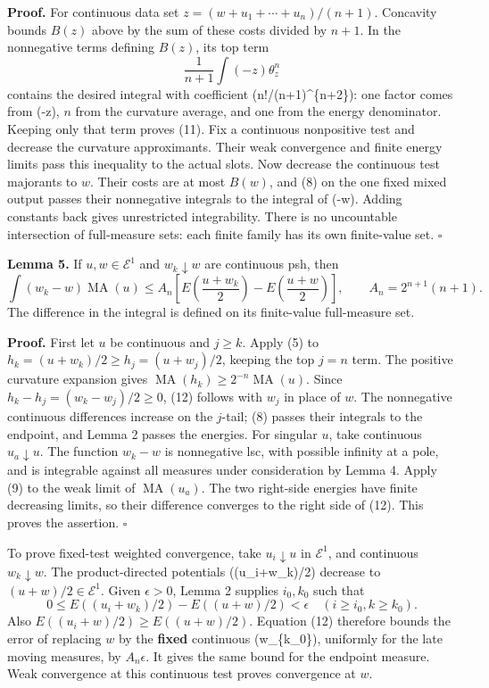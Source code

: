 \documentclass[
]{article}
\begin{document}
\textbf{Proof.} For continuous data set \(z=(w+u_1+\cdots+u_n)/(n+1)\).
Concavity bounds \(B(z)\) above by the sum of these costs divided by
\(n+1\). In the nonnegative terms defining \(B(z)\), its top term \[
\frac1{n+1}\int(-z)\theta_z^n
\] contains the desired integral with coefficient (n!/(n+1)\^{}\{n+2\}):
one factor comes from (-z), \(n\) from the curvature average, and one
from the energy denominator. Keeping only that term proves (11). Fix a
continuous nonpositive test and decrease the curvature approximants.
Their weak convergence and finite energy limits pass this inequality to
the actual slots. Now decrease the continuous test majorants to \(w\).
Their costs are at most \(B(w)\), and (8) on the one fixed mixed output
passes their nonnegative integrals to the integral of (-w). Adding
constants back gives unrestricted integrability. There is no uncountable
intersection of full-measure sets: each finite family has its own
finite-value set. \(\square\)

\textbf{Lemma 5.} If \(u,w\in\mathcal E^1\) and \(w_k\downarrow w\) are
continuous psh, then \[
\int(w_k-w)\operatorname{MA}(u)
\leq A_n\left[E\left(\frac{u+w_k}{2}\right)-E\left(\frac{u+w}{2}\right)\right],
\qquad A_n=2^{n+1}(n+1).
\tag{12}
\] The difference in the integral is defined on its finite-value
full-measure set.

\textbf{Proof.} First let \(u\) be continuous and \(j\geq k\). Apply (5)
to \(h_k=(u+w_k)/2\geq h_j=(u+w_j)/2\), keeping the top \(j=n\) term.
The positive curvature expansion gives
\(\operatorname{MA}(h_k)\geq2^{-n}\operatorname{MA}(u)\). Since
\(h_k-h_j=(w_k-w_j)/2\geq0\), (12) follows with \(w_j\) in place of
\(w\). The nonnegative continuous differences increase on the
\(j\)-tail; (8) passes their integrals to the endpoint, and Lemma 2
passes the energies. For singular \(u\), take continuous
\(u_a\downarrow u\). The function \(w_k-w\) is nonnegative lsc, with
possible infinity at a pole, and is integrable against all measures
under consideration by Lemma 4. Apply (9) to the weak limit of
\(\operatorname{MA}(u_a)\). The two right-side energies have finite
decreasing limits, so their difference converges to the right side of
(12). This proves the assertion. \(\square\)

To prove fixed-test weighted convergence, take \(u_i\downarrow u\) in
\(\mathcal E^1\), and continuous \(w_k\downarrow w\). The
product-directed potentials ((u\_i+w\_k)/2) decrease to
\((u+w)/2\in\mathcal E^1\). Given \(\epsilon>0\), Lemma 2 supplies
\(i_0,k_0\) such that \[
0\leq E((u_i+w_k)/2)-E((u+w)/2)<\epsilon\quad(i\geq i_0,k\geq k_0).
\] Also \(E((u_i+w)/2)\geq E((u+w)/2)\). Equation (12) therefore bounds
the error of replacing \(w\) by the \textbf{fixed} continuous
(w\_\{k\_0\}), uniformly for the late moving measures, by
\(A_n\epsilon\). It gives the same bound for the endpoint measure. Weak
convergence at this continuous test proves convergence at \(w\).
\end{document}
